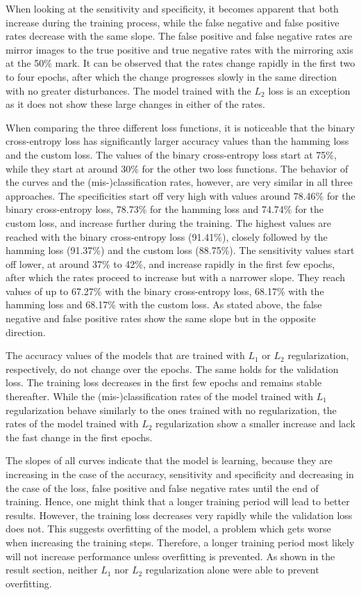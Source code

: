 When looking at the sensitivity and specificity, it becomes apparent that both increase during the training process, while the false negative and false positive rates decrease with the same slope. The false positive and false negative rates are mirror images to the true positive and true negative rates with the mirroring axis at the 50\% mark. It can be observed that the rates change rapidly in the first two to four epochs, after which the change progresses slowly in the same direction with no greater disturbances. The model trained with the \(L_2\) loss is an exception as it does not show these large changes in either of the rates.

\bigskip
When comparing the three different loss functions, it is noticeable that the binary cross-entropy loss has significantly larger accuracy values than the hamming loss and the custom loss. The values of the binary cross-entropy loss start at 75\%, while they start at around 30\% for the other two loss functions. The behavior of the curves and the (mis-)classification rates, however, are very similar in all three approaches. The specificities start off very high with values around 78.46\% for the binary cross-entropy loss, 78.73\% for the hamming loss and 74.74\% for the custom loss, and increase further during the training. The highest values are reached with the binary cross-entropy loss (91.41\%), closely followed by the hamming loss (91.37\%) and the custom loss (88.75\%). The sensitivity values start off lower, at around 37\% to 42\%, and increase rapidly in the first few epochs, after which the rates proceed to increase but with a narrower slope. They reach values of up to 67.27\% with the binary cross-entropy loss, 68.17\% with the hamming loss and 68.17\% with the custom loss. As stated above, the false negative and false positive rates show the same slope but in the opposite direction.

The accuracy values of the models that are trained with \(L_1\) or \(L_2\) regularization, respectively, do not change over the epochs. The same holds for the validation loss. The training loss decreases in the first few epochs and remains stable thereafter.
While the (mis-)classification rates of the model trained with \(L_1\) regularization behave similarly to the ones trained with no regularization, the rates of the model trained with \(L_2\) regularization show a smaller increase and lack the fast change in the first epochs.

The slopes of all curves indicate that the model is learning, because they are increasing in the case of the accuracy, sensitivity and specificity and decreasing in the case of the loss, false positive and false negative rates until the end of training. Hence, one might think that a longer training period will lead to better results. However, the training loss decreases very rapidly while the validation loss does not. This suggests overfitting of the model, a problem which gets worse when increasing the training steps. Therefore, a longer training period most likely will not increase performance unless overfitting is prevented. As shown in the result section, neither \(L_1\) nor \(L_2\) regularization alone were able to prevent overfitting.


